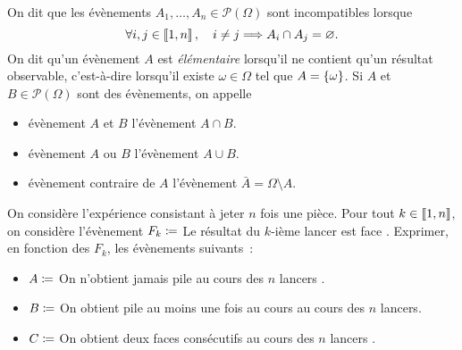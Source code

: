\documentclass{magnolia}
\begin{document}
\begin{remarques}
\remarque On dit que les évènements $A_1,\ldots,A_n\in\mathcal{P}(\Omega)$ sont incompatibles
  lorsque
  \[\forall i,j\in\left\llbracket 1,n\right\rrbracket,\quad i\neq j\Longrightarrow A_i\cap A_j=\varnothing.\]
\remarque On dit qu'un évènement $A$ est \emph{élémentaire} lorsqu'il ne contient qu'un résultat
  observable, c'est-à-dire lorsqu'il existe $\omega\in\Omega$ tel que $A=\left\{\omega\right\}$.
\remarque Si $A$ et $B\in\mathcal{P}(\Omega)$ sont des évènements, on appelle
  \begin{itemize}
  \item évènement \og $A$ et $B$ \fg l'évènement $A\cap B$.
  \item évènement \og $A$ ou $B$ \fg l'évènement $A\cup B$.
  \item évènement \og contraire de $A$ \fg l'évènement $\bar{A}=\Omega\setminus A$.
  \end{itemize}
\end{remarques}


\begin{exoUnique}
\exo On considère l'expérience consistant à jeter $n$ fois une pièce.
  Pour tout $k\in\left\llbracket 1,n\right\rrbracket$, on considère l'évènement
  $F_k\coloneqq$ \og Le résultat du $k$-ième lancer est face \fg. Exprimer, en fonction des $F_k$,
  les évènements suivants~:
  \begin{itemize}
  \item $A\coloneqq$ \og On n'obtient jamais pile au cours des $n$ lancers \fg.
  \item $B\coloneqq$ \og On obtient pile au moins une fois au cours au cours des $n$ lancers\fg.
  \item $C\coloneqq$ \og On obtient deux faces consécutifs au cours des $n$ lancers \fg.
  \end{itemize}

\end{exoUnique}
\end{document}
